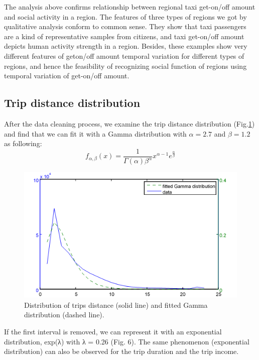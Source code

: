 \documentclass[a4paper, 10pt, conference]{ieeeconf}      %
\begin{document}
The analysis above confirms relationship between regional taxi get-on/off amount and social activity in a region. The features of three types of regions we got by qualitative analysis conform to common sense. They show that taxi passengers are a kind of representative samples from citizens, and taxi get-on/off amount depicts human activity strength in a region. Besides, these examples show very different features of geton/off amount temporal variation for different types of regions, and hence the feasibility of recognizing social function of regions using temporal variation of get-on/off amount.

\subsection{Trip distance distribution}After the data cleaning process, we examine the trip distance distribution (Fig.\ref{fig:my_png_5}) and find that we can fit it with a Gamma distribution with $ \alpha =2.7 $ and $\beta =1.2 $ as following:
 \begin{equation}
 	f_{\alpha,\beta}(x)=\frac{1}{\Gamma(\alpha)\beta^{\alpha}}x^{\alpha-1}e^{\frac{\alpha}{\beta}}
    \label{eq:quadratic}
\end{equation}

\begin{figure}[ht]
    \centering
    \includegraphics{fig/png5.png}
    \caption{Distribution of trips distance (solid line) and fitted Gamma distribution (dashed line). }
    \label{fig:my_png_5}
\end{figure}

If the first interval is removed, we can represent it with an exponential distribution, exp(λ) with λ = 0.26 (Fig. 6). The same phenomenon (exponential distribution) can also be observed for the trip duration and the trip income. 
\end{document}

